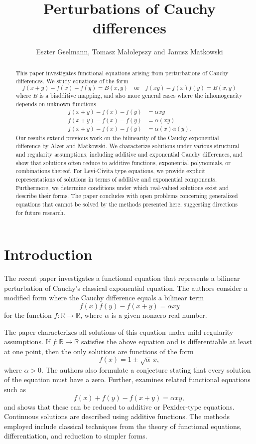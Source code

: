 \documentclass[a4paper,12pt]{article}
\title{Perturbations of Cauchy differences}
\author{Eszter Gselmann, Tomasz Małolepszy and Janusz Matkowski}
\theoremstyle{plain}
\theoremstyle{definition}
\theoremstyle{remark}
\begin{document}
\nocite{*}

\maketitle


\begin{abstract}
 This paper investigates functional equations arising from perturbations of Cauchy differences. We study equations of the form
 \[
f(x+y)-f(x)-f(y)=B(x,y) \quad \text{or} \quad f(xy)-f(x)f(y) = B(x,y)
\]
where $B$ is a biadditive mapping, and also more general cases where the inhomogeneity depends on unknown functions
\begin{align*}
 f(x+y)-f(x)-f(y)&= \alpha x y \\[2.5mm]
 f(x+y)-f(x)-f(y)&= \alpha (x y)\\[2.5mm]
 f(x+y)-f(x)-f(y)&= \alpha(x)\alpha(y).   
\end{align*}
Our results extend previous work on the bilinearity of the Cauchy exponential difference by Alzer and Matkowski. We characterize solutions under various structural and regularity assumptions, including additive and exponential Cauchy differences, and show that solutions often reduce to additive functions, exponential polynomials, or combinations thereof. For Levi-Civita type equations, we provide explicit representations of solutions in terms of additive and exponential components. Furthermore, we determine conditions under which real-valued solutions exist and describe their forms. The paper concludes with open problems concerning generalized equations that cannot be solved by the methods presented here, suggesting directions for future research.
\end{abstract}


\section{Introduction}


The recent paper \cite{AlzMat24} investigates a functional equation that represents a bilinear perturbation of Cauchy’s classical exponential equation. 
The authors consider a modified form where the Cauchy difference equals a bilinear term
\[
f(x)f(y) - f(x+y) = \alpha xy 
\]
for the function $f\colon \mathbb{R}\to \mathbb{R}$, where $\alpha$ is a given nonzero real number. 

The paper characterizes all solutions of this equation under mild regularity assumptions. If \(f \colon \mathbb{R} \to \mathbb{R}\) satisfies the above equation and is differentiable at least at one point, then the only solutions are functions of the form
\[
f(x) = 1 \pm \sqrt{\alpha}\, x,
\]
where \(\alpha > 0\). The authors also formulate a conjecture stating that every solution of the equation must have a zero. 
Further, \cite{AlzMat24} examines related functional equations such as
\[
f(x) + f(y) - f(x+y) = \alpha xy,
\]
and shows that these can be reduced to additive or Pexider-type equations. Continuous solutions are described using additive functions. The methods employed include classical techniques from the theory of functional equations, differentiation, and reduction to simpler forms.
\end{document}
